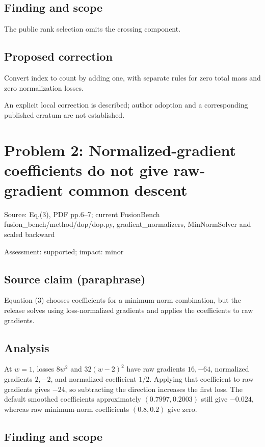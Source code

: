 \documentclass[11pt]{article}
\begin{document}
\subsection*{Finding and scope}

The public rank selection omits the crossing component.

\subsection*{Proposed correction}

Convert index to count by adding one, with separate rules for zero total mass and zero normalization losses.

An explicit local correction is described; author adoption and a corresponding published erratum are not established.

\section*{Problem 2: Normalized-gradient coefficients do not give raw-gradient common descent}

Source: Eq.(3), PDF pp.6–7; current FusionBench fusion\_bench/method/dop/dop.py, gradient\_normalizers, MinNormSolver and scaled backward

Assessment: supported; impact: minor

\subsection*{Source claim (paraphrase)}

Equation (3) chooses coefficients for a minimum-norm combination, but the release solves using loss-normalized gradients and applies the coefficients to raw gradients.

\subsection*{Analysis}

At \(w=1\), losses \(8w^2\) and \(32(w-2)^2\) have raw gradients \(16,-64\), normalized gradients \(2,-2\), and normalized coefficient \(1/2\). Applying that coefficient to raw gradients gives \(-24\), so subtracting the direction increases the first loss. The default smoothed coefficients approximately \((0.7997,0.2003)\) still give \(-0.024\), whereas raw minimum-norm coefficients \((0.8,0.2)\) give zero.

\subsection*{Finding and scope}
\end{document}
